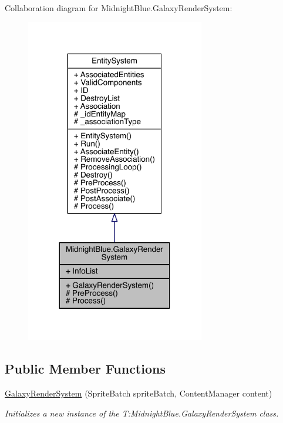 Collaboration diagram for Midnight\+Blue.\+Galaxy\+Render\+System\+:
\nopagebreak
\begin{figure}[H]
\begin{center}
\leavevmode
\includegraphics[width=221pt]{class_midnight_blue_1_1_galaxy_render_system__coll__graph}
\end{center}
\end{figure}
\subsection*{Public Member Functions}
\begin{DoxyCompactItemize}
\item 
\hyperlink{class_midnight_blue_1_1_galaxy_render_system_aee5d42f0287d1bfed669e2a2656c5c28}{Galaxy\+Render\+System} (Sprite\+Batch sprite\+Batch, Content\+Manager content)
\begin{DoxyCompactList}\small\item\em Initializes a new instance of the T\+:\+Midnight\+Blue.\+Galaxy\+Render\+System class. \end{DoxyCompactList}\end{DoxyCompactItemize}

